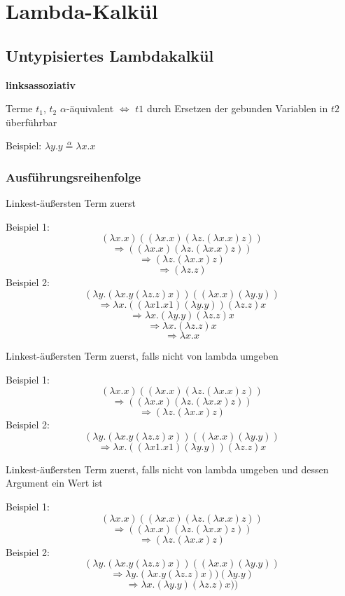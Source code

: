 \section{Lambda-Kalkül}
\subsection{Untypisiertes Lambdakalkül}
\textbf{linksassoziativ}
\begin{defi}
	Terme $t_1$,  $t_2$ $\alpha$-äquivalent $\Leftrightarrow$ $t1$ durch Ersetzen der gebunden Variablen in $t2$ überführbar
\end{defi}
Beispiel: $\lambda y.y \stackrel{\alpha}{=} \lambda x.x$

\subsubsection{Ausführungsreihenfolge}

\begin{defi}[Normalenreihenfolge]
	Linkest-äußersten Term zuerst
\end{defi}
Beispiel 1:\\
$$(\lambda x.x)((\lambda x.x) (\lambda z. (\lambda x.x) z))$$
$$ \Rightarrow ((\lambda x.x) (\lambda z. (\lambda x.x) z))$$
$$ \Rightarrow (\lambda z. (\lambda x.x) z)$$
$$ \Rightarrow (\lambda z. z)$$
Beispiel 2:\\
$$(\lambda y. (\lambda x. y (\lambda z.z) x)) ((\lambda x.x) (\lambda y.y))$$
$$\Rightarrow \lambda x. ((\lambda x1.x1) (\lambda y.y)) (\lambda z.z) x $$
$$\Rightarrow \lambda x. (\lambda y.y) (\lambda z.z) x$$
$$\Rightarrow \lambda x. (\lambda z.z) x $$
$$\Rightarrow \lambda x. x $$
\begin{defi}
		Linkest-äußersten Term zuerst, falls nicht von lambda umgeben
\end{defi}
Beispiel 1:\\
$$(\lambda x.x)((\lambda x.x) (\lambda z. (\lambda x.x) z))$$
$$ \Rightarrow ((\lambda x.x) (\lambda z. (\lambda x.x) z))$$
$$ \Rightarrow (\lambda z. (\lambda x.x) z)$$
Beispiel 2:\\
$$(\lambda y. (\lambda x. y (\lambda z.z) x)) ((\lambda x.x) (\lambda y.y))$$
$$\Rightarrow \lambda x. ((\lambda x1.x1) (\lambda y.y)) (\lambda z.z) x $$
\begin{defi}
	Linkest-äußersten Term zuerst, falls nicht von lambda umgeben und dessen Argument ein Wert ist
\end{defi}
Beispiel 1:\\
$$(\lambda x.x)((\lambda x.x) (\lambda z. (\lambda x.x) z))$$
$$ \Rightarrow ((\lambda x.x) (\lambda z. (\lambda x.x) z))$$
$$ \Rightarrow (\lambda z. (\lambda x.x) z)$$
Beispiel 2:\\
$$(\lambda y. (\lambda x. y (\lambda z.z) x)) ((\lambda x.x) (\lambda y.y))$$
$$\Rightarrow \lambda y. (\lambda x. y (\lambda z.z) x)) (\lambda y.y)$$
$$\Rightarrow \lambda x. (\lambda y.y) (\lambda z.z) x))$$

